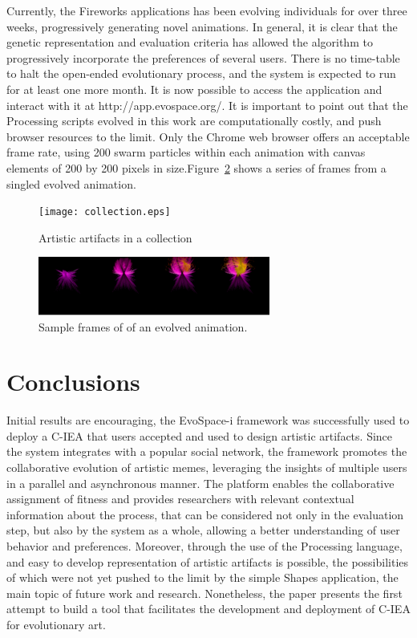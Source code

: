 \documentclass{sig-alternate}
\begin{document}
Currently, the Fireworks applications has been
evolving individuals for over three weeks, progressively generating
novel animations. In general, it is clear that the genetic
representation and evaluation criteria has allowed the algorithm
to progressively incorporate the preferences of several users.
There is no time-table to halt the open-ended evolutionary
process, and the system is expected to run for at least one
more month. It is now possible to access the application and
interact with it at http://app.evospace.org/. It is important to
point out that the Processing scripts evolved in this work
are computationally costly, and push browser resources to the
limit. Only the Chrome web browser offers an acceptable
frame rate, using 200 swarm particles within each animation
with canvas elements of 200 by 200 pixels in size.Figure~\ref{fig:fireworks}
shows a series of frames from a singled evolved animation.
\begin{figure}[t]
    \centering
        \texttt{[image: collection.eps]}
    \caption{Artistic artifacts in a collection }
    \label{fig:collection}
\end{figure}


\begin{figure}[t]
    \centering
        \includegraphics[width=3in]{fireworks.eps}
    \caption{Sample frames of of an evolved animation. }
    \label{fig:fireworks}
\end{figure}

\section{Conclusions}
Initial results are encouraging, the EvoSpace-i framework was successfully used to deploy a C-IEA that users accepted and used to design artistic artifacts.
Since the system integrates with a popular social network, the framework promotes the collaborative evolution of artistic memes,
leveraging the insights of multiple users in a parallel and asynchronous manner. The platform enables the collaborative assignment of fitness and provides researchers with relevant contextual information about the process, that can be considered not only in the evaluation step, but also by the system as a whole, allowing a better understanding of user behavior and preferences.
Moreover, through the use of the Processing language, and easy to develop representation of artistic artifacts is possible,
the possibilities of which were not yet pushed to the limit by the simple Shapes application, the main topic of future work and research. Nonetheless, the paper presents the first attempt to build a tool that facilitates the development and deployment of C-IEA for evolutionary art.
\end{document}
